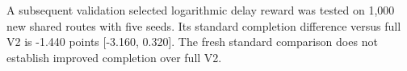 A subsequent validation selected logarithmic delay reward was tested on 1,000 new shared routes with five seeds. Its standard completion difference versus full V2 is -1.440 points [-3.160, 0.320]. The fresh standard comparison does not establish improved completion over full V2.
